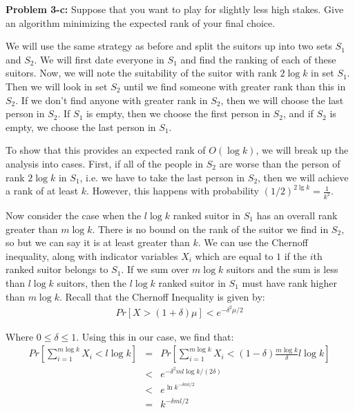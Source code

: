 \documentclass[psamsfonts]{amsart}
\newenvironment{sol}{\vspace{0.25cm}{\large \bfseries Solution:}}{\qedsymbol}
\newenvironment{prob}[1]{\begin{framed}{\large \bfseries Problem #1:}}{\end{framed}}
\begin{document}
\begin{prob}{3-c}
Suppose that you want to play for slightly less high stakes. Give an algorithm minimizing the expected rank of your final choice.
\end{prob}
\begin{sol}
We will use the same strategy as before and split the suitors up into two sets $S_1$ and $S_2$. We will first date everyone in $S_1$ and find the ranking of each of these suitors. Now, we will note the suitability of the suitor with rank $2 \log k$ in set $S_1$. Then we will look in set $S_2$ until we find someone with greater rank than this in $S_2$. If we don't find anyone with greater rank in $S_2$, then we will choose the last person in $S_2$. If $S_1$ is empty, then we choose the first person in $S_2$, and if $S_2$ is empty, we choose the last person in $S_1$.

To show that this provides an expected rank of $O(\log k)$, we will break up the analysis into cases. First, if all of the people in $S_2$ are worse than the person of rank $2 \log k$ in $S_1$, i.e. we have to take the last person in $S_2$, then we will achieve a rank of at least $k$. However, this happens with probability $(1/2)^{2 \lg k} = \frac{1}{k^2}$. 

Now consider the case when the $l \log k$ ranked suitor in $S_1$ has an overall rank greater than $m \log k$. There is no bound on the rank of the suitor we find in $S_2$, so but we can say it is at least greater than $k$. We can use the Chernoff inequality, along with indicator variables $X_i$ which are equal to $1$ if the $i$th ranked suitor belongs to $S_1$. If we sum over $m \log k$ suitors and the sum is less than $l \log k$ suitors, then the $l \log k$ ranked suitor in $S_1$ must have rank higher than $m \log k$. Recall that the Chernoff Inequality is given by:
\begin{eqnarray}
Pr[X > (1 + \delta) \mu] < e^{-\delta^2 \mu / 2}
\end{eqnarray}

Where $0 \leq \delta \leq 1$. Using this in our case, we find that:
\begin{eqnarray}
Pr\left[\sum_{i=1}^{m \log k} X_i < l \log k \right] &=& Pr \left[\sum_{i=1}^{m \log k} X_i < (1 - \delta) \frac{m \log k}{\delta} l \log k \right] \\
&<& e^{-\delta^2 m l \log k / (2 \delta)} \\
&<& e^{\ln k^{-\delta m l / 2}} \\
&=& k^{-\delta m l / 2}
\end{eqnarray}


\end{sol}
\end{document}

